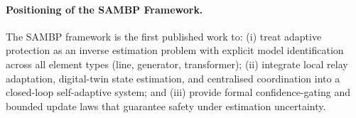 \paragraph{Positioning of the SAMBP Framework.}
The SAMBP framework is the first published work to:
(i) treat adaptive protection as an inverse estimation problem with
explicit model identification across all element types (line, generator,
transformer);
(ii) integrate local relay adaptation, digital-twin state estimation, and
centralised coordination into a closed-loop self-adaptive system; and
(iii) provide formal confidence-gating and bounded update laws that
guarantee safety under estimation uncertainty.
